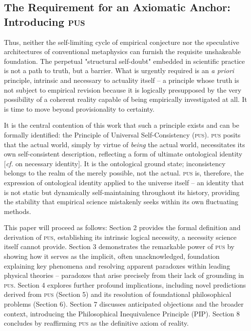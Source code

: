 \documentclass[11pt, a4paper]{article}
\newcommand{\pus}{\textsc{pus}} %
\begin{document}
\subsection{The Requirement for an Axiomatic Anchor: Introducing \pus}
Thus, neither the self-limiting cycle of empirical conjecture nor the speculative architectures of conventional metaphysics can furnish the requisite unshakeable foundation. The perpetual "structural self-doubt" embedded in scientific practice is not a path to truth, but a barrier. What is urgently required is an \textit{a priori} principle, intrinsic and necessary to actuality itself – a principle whose truth is not subject to empirical revision because it is logically presupposed by the very possibility of a coherent reality capable of being empirically investigated at all. It is time to move beyond provisionality to certainty.

It is the central contention of this work that such a principle exists and can be formally identified: the Principle of Universal Self-Consistency (\pus). \pus{} posits that the actual world, simply by virtue of \textit{being} the actual world, necessitates its own self-consistent description, reflecting a form of ultimate ontological identity [\textit{cf.} \citealp{kripke1980} on necessary identity]. It is the ontological ground state; inconsistency belongs to the realm of the merely possible, not the actual. \pus{} is, therefore, the expression of ontological identity applied to the universe itself – an identity that is not static but dynamically self-maintaining throughout its history, providing the stability that empirical science mistakenly seeks within its own fluctuating methods.

This paper will proceed as follows: Section 2 provides the formal definition and derivation of \pus, establishing its intrinsic logical necessity, a necessity science itself cannot provide. Section 3 demonstrates the remarkable power of \pus{} by showing how it serves as the implicit, often unacknowledged, foundation explaining key phenomena and resolving apparent paradoxes within leading physical theories – paradoxes that arise precisely from their lack of grounding in \pus. Section 4 explores further profound implications, including novel predictions derived from \pus{} (Section 5) and its resolution of foundational philosophical problems (Section 6). Section 7 discusses anticipated objections and the broader context, introducing the Philosophical Inequivalence Principle (PIP). Section 8 concludes by reaffirming \pus{} as the definitive axiom of reality.
\end{document}
